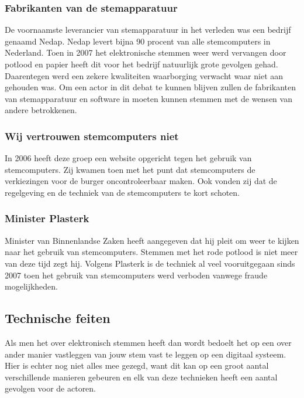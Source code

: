 \documentclass[a4paper]{article}
\begin{document}
\subsubsection{Fabrikanten van de stemapparatuur}
De voornaamste leverancier van stemapparatuur in het verleden was een bedrijf genaamd Nedap.
Nedap levert bijna 90 procent van alle stemcomputers in Nederland.
Toen in 2007 het elektronische stemmen weer werd vervangen door potlood en papier heeft dit voor het bedrijf natuurlijk grote gevolgen gehad.
Daarentegen werd een zekere kwaliteiten waarborging verwacht waar niet aan gehouden was.
Om een actor in dit debat te kunnen blijven zullen de fabrikanten van stemapparatuur en software in moeten kunnen stemmen met de wensen van andere betrokkenen.

\subsubsection{Wij vertrouwen stemcomputers niet}
In 2006 heeft deze groep een website opgericht tegen het gebruik van stemcomputers. 
Zij kwamen toen met het punt dat stemcomputers de verkiezingen voor de burger oncontroleerbaar maken.
Ook vonden zij dat de regelgeving en de techniek van de stemcomputers te kort schoten.

\subsubsection{Minister Plasterk}
Minister van Binnenlandse Zaken heeft aangegeven dat hij pleit om weer te kijken naar het gebruik van stemcomputers.
Stemmen met het rode potlood is niet meer van deze tijd zegt hij. 
Volgens Plasterk is de techniek al veel vooruitgegaan sinds 2007 toen het gebruik van stemcomputers werd verboden vanwege fraude mogelijkheden.


\subsection{Technische feiten}

Als men het over elektronisch stemmen heeft dan wordt bedoelt het op een over ander manier vastleggen van jouw stem vast te leggen op een digitaal systeem.
Hier is echter nog niet alles mee gezegd, want dit kan op een groot aantal verschillende manieren gebeuren en elk van deze technieken heeft een aantal gevolgen voor de actoren. 
\end{document}
